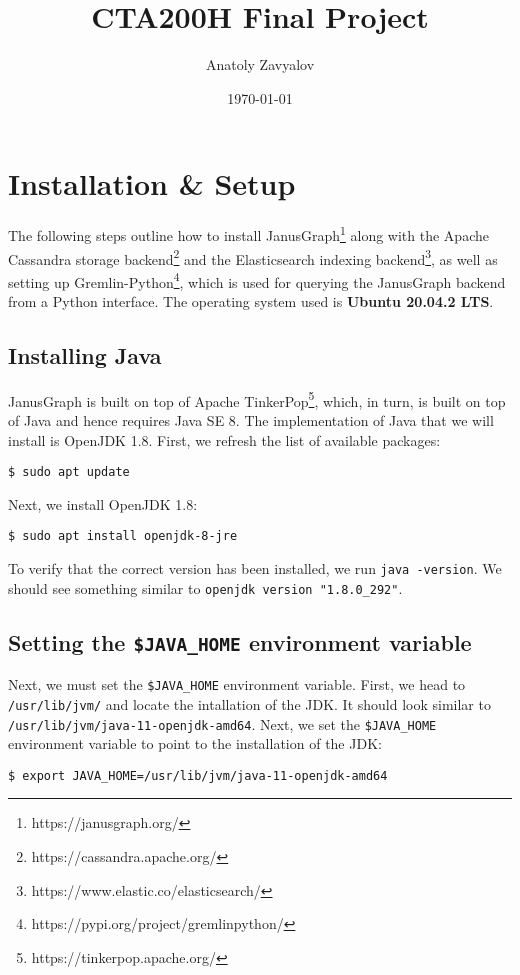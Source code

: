 \documentclass[12pt]{article}
\newcommand{\code}[1]{\colorbox{backcolour}{\texttt{#1}}}
\begin{document}
\title{CTA200H Final Project}
\author{Anatoly Zavyalov}
\date{\today}
\maketitle

\section{Installation \& Setup}

The following steps outline how to install JanusGraph\footnote{https://janusgraph.org/} along with the Apache Cassandra storage backend\footnote{https://cassandra.apache.org/} and the Elasticsearch indexing backend\footnote{https://www.elastic.co/elasticsearch/}, as well as setting up Gremlin-Python\footnote{https://pypi.org/project/gremlinpython/}, which is used for querying the JanusGraph backend from a Python interface. The operating system used is \textbf{Ubuntu 20.04.2 LTS}.

\subsection{Installing Java}

JanusGraph is built on top of Apache TinkerPop\footnote{https://tinkerpop.apache.org/}, which, in turn, is built on top of Java and hence requires Java SE 8. The implementation of Java that we will install is OpenJDK 1.8. First, we refresh the list of available packages:
\begin{lstlisting}[numbers=none]
$ sudo apt update
\end{lstlisting} 

Next, we install OpenJDK 1.8:
\begin{lstlisting}[numbers=none]
$ sudo apt install openjdk-8-jre
\end{lstlisting}

To verify that the correct version has been installed, we run \code{java -version}. We should see something similar to \code{openjdk version "1.8.0\_292"}. 

\subsection{Setting the \code{\$JAVA\_HOME} environment variable}
Next, we must set the \code{\$JAVA\_HOME} environment variable. First, we head to \code{/usr/lib/jvm/} and locate the intallation of the JDK. It should look similar to \code{/usr/lib/jvm/java-11-openjdk-amd64}. Next, we set the \code{\$JAVA\_HOME} environment variable to point to the installation of the JDK:
\begin{lstlisting}[numbers=none]
$ export JAVA_HOME=/usr/lib/jvm/java-11-openjdk-amd64 
\end{lstlisting}
\end{document}
